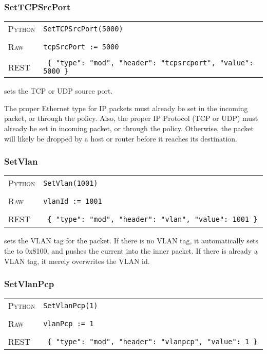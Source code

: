 \subsubsection{SetTCPSrcPort}

\bigskip
\begin{tabularx}{\linewidth}{lX}
\textsc{Python}   & \texttt{SetTCPSrcPort(5000)} \\ \\
\textsc{Raw}    & \texttt{tcpSrcPort := 5000}     \\ \\
\textsc{REST} & \texttt{ \{ "type": "mod", "header": "tcpsrcport", "value": 5000 \} }
\end{tabularx}

 sets the TCP or UDP source port.      

The proper Ethernet type for IP packets must already be set in the incoming packet, or through the 
 policy.  
Also, the proper IP Protocol (TCP or UDP) must already be set in incoming packet, or through the 
 policy.  
Otherwise, the packet will likely be dropped by a host or router before it 
reaches its destination.

\subsubsection{SetVlan}

\bigskip
\begin{tabularx}{\linewidth}{lX}
\textsc{Python}   & \texttt{SetVlan(1001)} \\ \\
\textsc{Raw}    & \texttt{vlanId := 1001}     \\ \\
\textsc{REST} & \texttt{ \{ "type": "mod", "header": "vlan", "value": 1001 \} }
\end{tabularx}

 sets the VLAN tag for the packet.  If there is no VLAN tag, it automatically sets 
the  to 0x8100, and pushes the current  into the inner packet.  If there
is already a VLAN tag, it merely overwrites the VLAN id.

\subsubsection{SetVlanPcp}

\bigskip
\begin{tabularx}{\linewidth}{lX}
\textsc{Python}   & \texttt{SetVlanPcp(1)} \\ \\
\textsc{Raw}    & \texttt{vlanPcp := 1}     \\ \\
\textsc{REST} & \texttt{ \{ "type": "mod", "header": "vlanpcp", "value": 1 \} }
\end{tabularx}


